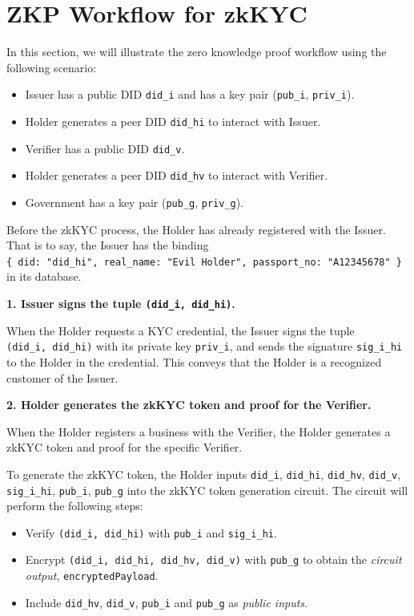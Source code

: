 \documentclass[
]{report}
\providecommand{\tightlist}{%
  \setlength{\itemsep}{0pt}\setlength{\parskip}{0pt}}
\begin{document}
\section{ZKP Workflow for zkKYC}

In this section, we will illustrate the zero knowledge proof workflow
using the following scenario:

\begin{itemize}
\tightlist
\item
  Issuer has a public DID \texttt{did\_i} and has a key pair
  (\texttt{pub\_i}, \texttt{priv\_i}).
\item
  Holder generates a peer DID \texttt{did\_hi} to interact with Issuer.
\item
  Verifier has a public DID \texttt{did\_v}.
\item
  Holder generates a peer DID \texttt{did\_hv} to interact with
  Verifier.
\item
  Government has a key pair (\texttt{pub\_g}, \texttt{priv\_g}).
\end{itemize}

Before the zkKYC process, the Holder has already registered with the
Issuer. That is to say, the Issuer has the binding
\texttt{\{\ did:\ "did\_hi",\ real\_name:\ "Evil\ Holder",\ passport\_no:\ "A12345678"\ \}}
in its database.

\textbf{1. Issuer signs the tuple \texttt{(did\_i,\ did\_hi)}.}

When the Holder requests a KYC credential, the Issuer signs the tuple
\texttt{(did\_i,\ did\_hi)} with its private key \texttt{priv\_i}, and
sends the signature \texttt{sig\_i\_hi} to the Holder in the credential.
This conveys that the Holder is a recognized customer of the Issuer.

\textbf{2. Holder generates the zkKYC token and proof for the Verifier.}

When the Holder registers a business with the Verifier, the Holder
generates a zkKYC token and proof for the specific Verifier.

To generate the zkKYC token, the Holder inputs \texttt{did\_i},
\texttt{did\_hi}, \texttt{did\_hv}, \texttt{did\_v},
\texttt{sig\_i\_hi}, \texttt{pub\_i}, \texttt{pub\_g} into the zkKYC
token generation circuit. The circuit will perform the following
steps:

\begin{itemize}
\tightlist
\item
  Verify \texttt{(did\_i,\ did\_hi)} with \texttt{pub\_i} and
  \texttt{sig\_i\_hi}.
\item
  Encrypt \texttt{(did\_i,\ did\_hi,\ did\_hv,\ did\_v)} with
  \texttt{pub\_g} to obtain the \emph{circuit output},
  \texttt{encryptedPayload}.
\item
  Include \texttt{did\_hv}, \texttt{did\_v}, \texttt{pub\_i} and
  \texttt{pub\_g} as \emph{public inputs}.
\end{itemize}
\end{document}
